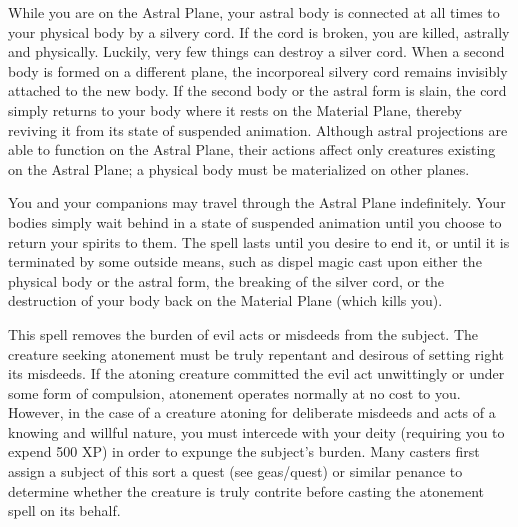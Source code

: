 \begin{multicols}{2}
\begin{small}
\smallskip\noindent While you are on the Astral Plane, your astral body is connected at all times to your physical body by a silvery cord. If the cord is broken, you are killed, astrally and physically. Luckily, very few things can destroy a silver cord. When a second body is formed on a different plane, the incorporeal silvery cord remains invisibly attached to the new body. If the second body or the astral form is slain, the cord simply returns to your body where it rests on the Material Plane, thereby reviving it from its state of suspended animation. Although astral projections are able to function on the Astral Plane, their actions affect only creatures existing on the Astral Plane; a physical body must be materialized on other planes.

\smallskip\noindent You and your companions may travel through the Astral Plane indefinitely. Your bodies simply wait behind in a state of suspended animation until you choose to return your spirits to them. The spell lasts until you desire to end it, or until it is terminated by some outside means, such as dispel magic cast upon either the physical body or the astral form, the breaking of the silver cord, or the destruction of your body back on the Material Plane (which kills you).


\noindent This spell removes the burden of evil acts or misdeeds from the subject. The creature seeking atonement must be truly repentant and desirous of setting right its misdeeds. If the atoning creature committed the evil act unwittingly or under some form of compulsion, atonement operates normally at no cost to you. However, in the case of a creature atoning for deliberate misdeeds and acts of a knowing and willful nature, you must intercede with your deity (requiring you to expend 500 XP) in order to expunge the subject's burden. Many casters first assign a subject of this sort a quest (see geas/quest) or similar penance to determine whether the creature is truly contrite before casting the atonement spell on its behalf.


\end{small}
\end{multicols}
